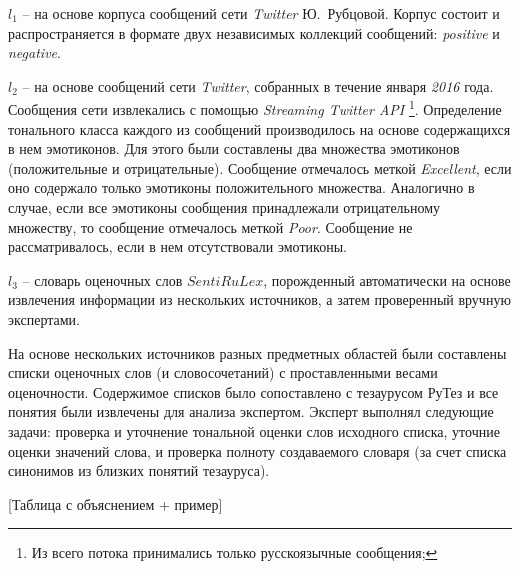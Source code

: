 $l_1$ -- на основе корпуса сообщений сети {\it Twitter} Ю.~Рубцовой.
Корпус состоит и распространяется в формате двух независимых коллекций
сообщений: {\it positive} и {\it negative}.

$l_2$ -- на основе сообщений сети {\it Twitter}, собранных в течение января {\it 2016} года.
Сообщения сети извлекались с помощью {\it Streaming Twitter API} \footnote{
    Из всего потока принимались только русскоязычные сообщения;
}.
Определение тонального класса каждого из сообщений производилось на
основе содержащихся в нем эмотиконов.
Для этого были составлены два множества эмотиконов (положительные и отрицательные).
Сообщение отмечалось меткой {\it Excellent}, если оно содержало
только эмотиконы положительного множества.
Аналогично в случае, если все эмотиконы сообщения принадлежали
отрицательному множеству, то сообщение отмечалось меткой {\it Poor}.
Сообщение не рассматривалось, если в нем отсутствовали эмотиконы.

$l_3$ -- словарь оценочных слов $SentiRuLex$, порожденный
автоматически на основе извлечения информации из нескольких источников,
а затем проверенный вручную экспертами.

На основе нескольких источников разных предметных областей были
составлены списки оценочных слов (и словосочетаний) с проставленными
весами оценочности.
Содержимое списков было сопоставлено с тезаурусом РуТез и все понятия
были извлечены для анализа экспертом.
Эксперт выполнял следующие задачи:
проверка и уточнение тональной оценки слов исходного списка,
уточние оценки значений слова,
и проверка полноту создаваемого словаря (за счет списка синонимов из
близких понятий тезауруса).

[Таблица с объяснением + пример]
